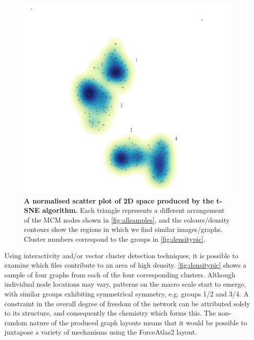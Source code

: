    \begin{figure}[H]
         \centering
    \includegraphics[width=.6\textwidth]{figures_c1/beijingtest/density.png}
     \caption{\textbf{A normalised scatter plot of 2D space produced by the t-SNE algorithm.} Each triangle represents a different arrangement of the MCM nodes shown in \autoref{fig:allsamples}, and the colours/density contours show the regions in which we find similar images/graphs. Cluster numbers correspond to the groups in \autoref{fig:densitypic}. }
     \label{fig:densty}
     \end{figure}

Using interactivity and/or vector cluster detection techniques, it is possible to examine which files contribute to an area of high density. \autoref{fig:densitypic} shows a sample of four graphs from each of the four corresponding clusters. Although individual node locations may vary, patterns on the macro scale start to emerge, with similar groups exhibiting symmetrical symmetry, e.g. groups 1/2 and 3/4. A constraint in the overall degree of freedom of the network can be attributed solely to its structure, and consequently the chemistry which forms this. The non-random nature of the produced graph layouts means that it would be possible to juxtapose a variety of mechanisms using the ForceAtlas2 layout.

